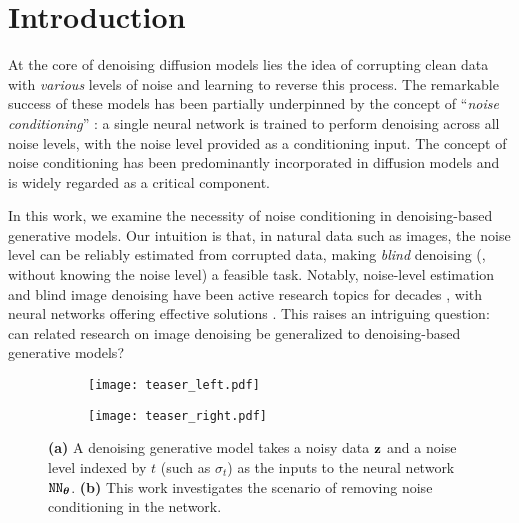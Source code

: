 \section{Introduction}\label{sec:intro}

At the core of denoising diffusion models \cite{sohl2015diffusion} lies the idea of corrupting clean data with \textit{\mbox{various}} levels of noise and learning to reverse this process. The remarkable success of these models has been partially underpinned by the concept of ``\textit{noise conditioning}'' \cite{sohl2015diffusion,song2019ncsn,ho2020denoising}: a single neural network is trained to perform denoising across all noise levels, with the noise level provided as a conditioning input. The concept of noise conditioning has been predominantly incorporated in diffusion models and is widely regarded as a critical component.

In this work, we examine the necessity of noise conditioning in denoising-based generative models. Our intuition is that, in natural data such as images, the noise level can be reliably estimated from corrupted data, making \textit{blind} denoising (\ie, without knowing the noise level) a feasible task. Notably, noise-level estimation and blind image denoising have been active research topics for decades \cite{stahl2000quantile,salmeri2001noise,rabie2005robust}, with neural networks offering effective solutions \cite{chen2018image,guo2019toward,zhang2023blind}. This raises an intriguing question: can related research on image denoising be generalized to denoising-based generative models?

\begin{figure}
   \vspace{0.8cm}
    \centering
    \begin{subfigure}[b]{0.42\linewidth}
        \centering
        \texttt{[image: teaser\_left.pdf]}
        \caption{}
        \label{fig:teaser_left}
    \end{subfigure}
    \hfill
    \begin{subfigure}[b]{0.42\linewidth}
        \centering
        \texttt{[image: teaser\_right.pdf]}
        \caption{}
        \label{fig:teaser_right}
    \end{subfigure}
    \vspace{-.5em}
    \caption{
    \textbf{(a)} A denoising generative model takes a noisy data ${\mathbf{z}}$ and a noise level indexed by $t$ (such as $\sigma_t$) as the inputs to the neural network ${\texttt{NN}}_{{\bm{\theta}}}$. \textbf{(b)} This work investigates the scenario of removing noise conditioning in the network.
 }
    \label{fig:main}
    \vspace{-1em}
\end{figure}

